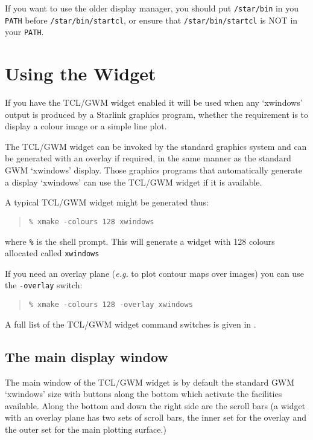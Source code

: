 If you want to use the older display manager, you should put {\tt{/star/bin}}
in you {\tt{PATH}} before {\tt{/star/bin/startcl}}, or ensure that
{\tt{/star/bin/startcl}} is NOT in your {\tt{PATH}}.

\section{\label{using_the_widget}Using the Widget}

If you have the TCL/GWM widget enabled it will be used when any `xwindows'
output is produced by a Starlink graphics program, whether the requirement
is to display a colour image or a simple line plot.

The TCL/GWM widget can be invoked by the standard graphics system and can
be generated with an overlay if required, in the same manner as the
standard GWM `xwindows' display.  Those graphics programs that automatically
generate a display `xwindows' can use the TCL/GWM widget if it is available.

A typical TCL/GWM widget might be generated thus:

\begin{quote}
{\tt \% xmake -colours 128 xwindows}
\end{quote}

where {\tt{\%}} is the shell prompt.  This will generate a widget with
128 colours allocated called {\tt{xwindows}}

If you need an overlay plane ({\em{e.g.}}\/ to plot contour maps over images)
you can use the {\tt{-overlay}} switch:

\begin{quote}
{\tt \% xmake -colours 128 -overlay xwindows}
\end{quote}

A full list of the TCL/GWM widget command switches is given in
.

\subsection{\label{the_main_display_window}The  main display window}

The main window of the TCL/GWM widget is by default the standard GWM
`xwindows' size with buttons along the bottom which activate the
facilities available.  Along the bottom and down the right side are the
scroll bars (a widget with an overlay plane has two sets of scroll
bars, the inner set for the overlay and the outer set for the main
plotting surface.)

